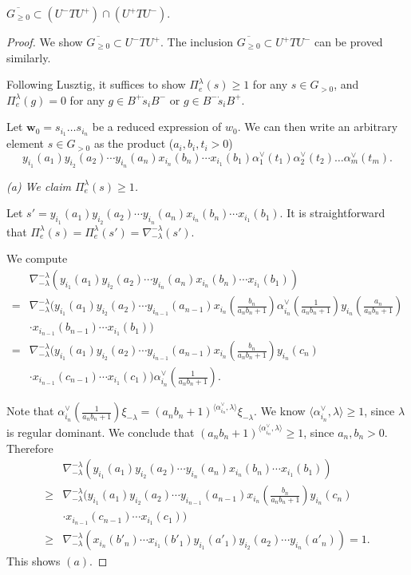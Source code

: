 \documentclass[10pt,a4paper]{amsart}
\begin{document}
\begin{thm}\label{thm:Lu4.3}
$\overline{G_{\ge 0}} \subset (U^- T U^+) \cap (U^+TU^-)$. 
\end{thm}

\begin{proof}We show $\overline{G_{\ge 0}} \subset U^- T U^+$. The inclusion $\overline{G_{\ge 0}} \subset U^+ T U^-$ can be proved similarly. 

Following Lusztig, it suffices to show $\Pi^\lambda_e(s) \geq 1$ for any $ s \in G_{>0}$, and $\Pi^\lambda_e(g) = 0$ for any $g \in B^+\dot s_iB^-$ or $g \in  B^-\dot s_iB^+$. 

Let $\mathbf{w}_0 = s_{i_1} \dots s_{i_n}$ be a reduced expression of $w_0$. We can then write an arbitrary element $s \in G_{>0}$ as the product ($a_i, b_i, t_i > 0$)
\[
y_{i_1}(a_1) y_{i_2}(a_2) \cdots y_{i_n}(a_n) x_{i_n}(b_n)  \cdots x_{i_1}(b_1) \alpha_{1}^\vee(t_1) \alpha_{2}^\vee(t_2) \dots \alpha_{m}^\vee(t_m).
\]

{\it (a) We claim $\Pi^\lambda_e(s) \ge 1$. } 

Let $s' = y_{i_1}(a_1) y_{i_2}(a_2) \cdots y_{i_n}(a_n) x_{i_n}(b_n)  \cdots x_{i_1}(b_1)$. It is straightforward that $\Pi^\lambda_e(s) = \Pi^\lambda_e(s') = \nabla^{-\lambda}_{-\lambda}(s')$. 

We compute 
\begin{align*}
&\nabla^{-\lambda}_{-\lambda}(y_{i_1}(a_1) y_{i_2}(a_2) \cdots y_{i_n}(a_n) x_{i_n}(b_n)  \cdots x_{i_1}(b_1)  ) \\
= & \nabla^{-\lambda}_{-\lambda}(y_{i_1}(a_1) y_{i_2}(a_2) \cdots y_{i_{n-1}}(a_{n-1}) x_{i_n}(\frac{b_n}{a_nb_n +1}) \alpha_{i_n}^\vee(\frac{1}{a_nb_n+1}) y_{i_n}(\frac{a_n}{a_nb_n +1}) \\
&\cdot x_{i_{n-1}}(b_{n-1}) \cdots x_{i_1}(b_1)) \\
= & \nabla^{-\lambda}_{-\lambda}(y_{i_1}(a_1) y_{i_2}(a_2) \cdots y_{i_{n-1}}(a_{n-1}) x_{i_n}(\frac{b_n}{a_nb_n +1})  y_{i_n}(c_n) \\
&\cdot x_{i_{n-1}}(c_{n-1}) \cdots x_{i_1}(c_1)) \alpha_{i_n}^\vee(\frac{1}{a_nb_n+1}).
\end{align*}

Note that $\alpha_{i_n}^\vee(\frac{1}{a_nb_n+1}) \xi_{-\lambda} = ({a_nb_n+1})^{\langle \alpha_{i_n}^\vee, \lambda\rangle } \xi_{-\lambda}$. We know $\langle \alpha_{i_n}^\vee, \lambda\rangle \ge 1$, since $\lambda $ is regular dominant. We conclude that $({a_nb_n+1})^{\langle \alpha_{i_n}^\vee, \lambda\rangle } \ge 1$, since $a_n, b_n > 0$. Therefore
\begin{align*}
&\nabla^{-\lambda}_{-\lambda}(y_{i_1}(a_1) y_{i_2}(a_2) \cdots y_{i_n}(a_n) x_{i_n}(b_n)  \cdots x_{i_1}(b_1)  ) \\
\ge & \nabla^{-\lambda}_{-\lambda}(y_{i_1}(a_1) y_{i_2}(a_2) \cdots y_{i_{n-1}}(a_{n-1}) x_{i_n}(\frac{b_n}{a_nb_n +1})  y_{i_n}(c_n) \\
&\cdot x_{i_{n-1}}(c_{n-1}) \cdots x_{i_1}(c_1)) \\
\ge & \nabla^{-\lambda}_{-\lambda} (x_{i_n}(b'_n)  \cdots x_{i_1}(b'_1) y_{i_1}(a'_1) y_{i_2}(a_2) \cdots y_{i_n}(a'_n)) =1.
\end{align*}
This shows $(a)$. 


\end{proof}
\end{document}
